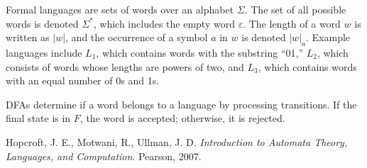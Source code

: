 \documentclass{article}
\begin{document}
Formal languages are sets of words over an alphabet $\Sigma$. The set of all possible words is denoted $\Sigma^*$, which includes the empty word $\varepsilon$. The length of a word $w$ is written as $|w|$, and the occurrence of a symbol $a$ in $w$ is denoted $|w|_a$. Example languages include $L_1$, which contains words with the substring “01,” $L_2$, which consists of words whose lengths are powers of two, and $L_3$, which contains words with an equal number of 0s and 1s.

DFAs determine if a word belongs to a language by processing transitions. If the final state is in $F$, the word is accepted; otherwise, it is rejected.

\newpage

\begin{thebibliography}{9}
 Hopcroft, J. E., Motwani, R., Ullman, J. D. \textit{Introduction to Automata Theory, Languages, and Computation}. Pearson, 2007.
\end{thebibliography}
\end{document}
